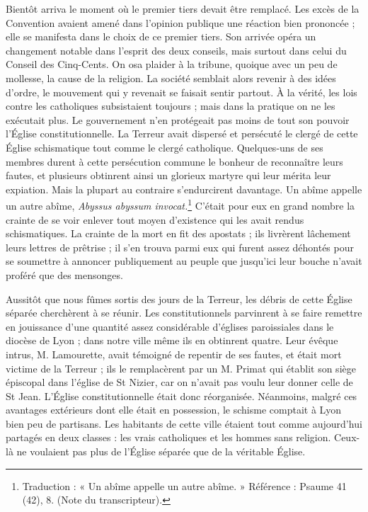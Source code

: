 Bientôt arriva le moment où le premier tiers devait être remplacé. Les excès de la Convention avaient amené dans l'opinion publique une réaction bien prononcée ; elle se manifesta dans le choix de ce premier tiers. Son arrivée opéra un changement notable dans l'esprit des deux conseils, mais surtout dans celui du Conseil des Cinq-Cents. On osa plaider à la tribune, quoique avec un peu de mollesse, la cause de la religion. La société semblait alors revenir à des idées d'ordre, le mouvement qui y revenait se faisait sentir partout. À la vérité, les lois contre les catholiques subsistaient
toujours ; mais dans la pratique on ne les exécutait plus. Le gouvernement n'en protégeait pas moins de tout son pouvoir l'Église constitutionnelle. La Terreur avait dispersé et persécuté le clergé de cette Église schismatique tout comme le clergé catholique. Quelques-uns de ses membres durent à cette persécution commune le bonheur de reconnaître leurs fautes, et plusieurs obtinrent ainsi un glorieux martyre qui leur mérita leur expiation. Mais la plupart au contraire s'endurcirent davantage. Un abîme appelle un autre abîme, \textit{Abyssus abyssum invocat.}\footnote{Traduction : « Un abîme appelle un autre abîme. » Référence : Psaume 41 (42), 8. (Note du transcripteur).} C'était pour eux en grand nombre la crainte de se voir enlever tout moyen d'existence qui les avait rendus schismatiques. La crainte de la mort en fit des apostats ; ils livrèrent lâchement leurs lettres de prêtrise ; il s'en trouva parmi eux qui furent assez déhontés pour se soumettre à annoncer publiquement au peuple que jusqu'ici leur bouche n'avait proféré que des mensonges.

Aussitôt que nous fûmes sortis des jours de la Terreur, les débris de cette Église séparée cherchèrent à se réunir. Les constitutionnels parvinrent à se faire remettre en jouissance d'une quantité assez considérable d'églises paroissiales dans le diocèse de Lyon ; dans notre ville même ils en obtinrent quatre. Leur évêque intrus, M. Lamourette, avait témoigné de repentir de ses fautes, et était mort victime de la Terreur ; ils le remplacèrent par un M. Primat qui établit son siège épiscopal dans l'église de St Nizier, car on n'avait pas voulu leur donner celle de St Jean. L'Église constitutionnelle était donc réorganisée. Néanmoins, malgré ces avantages
extérieurs dont elle était en possession, le schisme comptait à Lyon bien peu de partisans. Les habitants de cette ville étaient tout comme aujourd'hui partagés en deux classes : les vrais catholiques et les hommes sans religion. Ceux-là ne voulaient pas plus de l'Église séparée que de la véritable Église.

